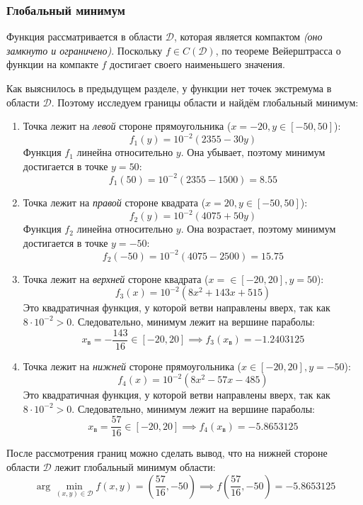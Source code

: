 \subsubsection{Глобальный минимум}

Функция рассматривается в области \( \mathcal{D} \), которая является компактом \textit{(оно замкнуто и ограничено)}. Поскольку \( f\in C(\mathcal{D}) \), по теореме Вейерштрасса о функции на компакте \( f \) достигает своего наименьшего значения.

Как выяснилось в предыдущем разделе, у функции нет точек экстремума в области \( \mathcal{D} \). Поэтому исследуем границы области и найдём глобальный минимум:

\begin{enumerate}
  \item Точка лежит на \textit{левой} стороне прямоугольника (\( x=-20, y \in [-50, 50] \)):
  \[
    f_1(y) = 10^{-2}(2355 - 30y)
  \]
  Функция \( f_1 \) линейна относительно \( y \). Она убывает, поэтому минимум достигается в точке \( y=50 \):
  \[
    f_1(50) = 10^{-2}(2355 - 1500) = 8.55
  \]
  \item Точка лежит на \textit{правой} стороне квадрата (\( x=20,y\in[-50,50] \)):
  \[
    f_2(y) = 10^{-2}(4075 + 50y)
  \]
  Функция \( f_2 \) линейна относительно \( y \). Она возрастает, поэтому минимум достигается в точке \( y=-50 \):
  \[
    f_2(-50) = 10^{-2}(4075 - 2500) = 15.75
  \]
  \item Точка лежит на \textit{верхней} стороне квадрата (\( x=\in[-20,20],y=50 \)):
  \[
    f_3(x) = 10^{-2}(8x^2 + 143x + 515)
  \]
  Это квадратичная функция, у которой ветви направлены вверх, так как \( 8\cdot 10^{-2}>0 \). Следовательно, минимум лежит на вершине параболы:
  \[
    x_{\text{в}}=-\dfrac{143}{16}\in[-20,20]\implies f_3(x_{\text{в}})= -1.2403125
  \]
  \item Точка лежит на \textit{нижней} стороне прямоугольника (\( x \in [-20, 20], y=-50 \)):
  \[
    f_4(x) = 10^{-2}(8x^2 - 57x - 485)
  \]
  Это квадратичная функция, у которой ветви направлены вверх, так как \( 8\cdot 10^{-2}>0 \). Следовательно, минимум лежит на вершине параболы:
  \[
    x_{\text{в}} = \dfrac{57}{16}\in[-20,20] \implies f_4(x_{\text{в}})= -5.8653125
  \]
\end{enumerate}

После рассмотрения границ можно сделать вывод, что на нижней стороне области \( \mathcal{D} \) лежит глобальный минимум области:
\[
  \arg\min_{(x,y)\in\mathcal{D}}f(x,y)=\left(\dfrac{57}{16},-50\right)\implies f\left(\dfrac{57}{16},-50\right)= -5.8653125
\]

